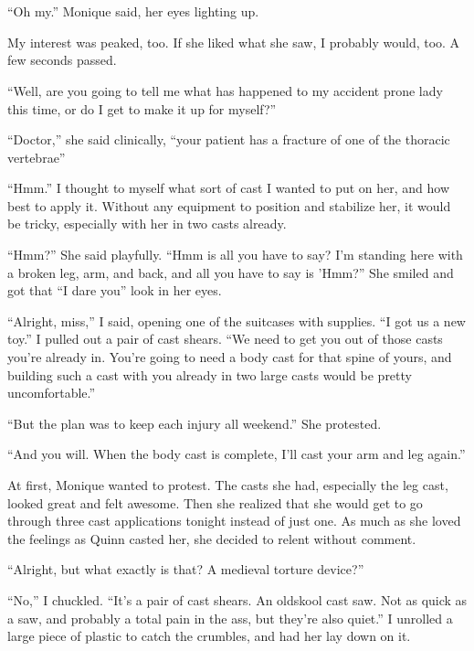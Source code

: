 \chapter{~}
``Oh my.'' Monique said, her eyes lighting up.

My interest was peaked, too. If she liked what she saw, I probably would, too. A few
seconds passed.

``Well, are you going to tell me what has happened to my accident prone lady this time, or
do I get to make it up for myself?''

``Doctor,'' she said clinically, ``your patient has a fracture of one of the thoracic
vertebrae''

``Hmm.'' I thought to myself what sort of cast I wanted to put on her, and how best to apply
it. Without any equipment to position and stabilize her, it would be tricky, especially with her
in two casts already.

``Hmm?'' She said playfully. ``Hmm is all you have to say? I'm standing here with a broken
leg, arm, and back, and all you have to say is 'Hmm?'' She smiled and got that ``I dare you''
look
in her eyes.

``Alright, miss,'' I said, opening one of the suitcases with supplies. ``I got us a new toy.''
I pulled out a pair of cast shears. ``We need to get you out of those casts you're already in.
You're going to need a body cast for that spine of yours, and building such a cast with you
already in two large casts would be pretty uncomfortable.''

``But the plan was to keep each injury all weekend.'' She protested.

``And you will. When the body cast is complete, I'll cast your arm and leg again.''

\begin{thought}
At first, Monique wanted to protest. The casts she had, especially the leg cast, looked
great and felt awesome. Then she realized that she would get to go through three cast
applications tonight instead of just one. As much as she loved the feelings as Quinn casted her,
she decided to relent without comment.
\end{thought}

``Alright, but what exactly is that? A medieval torture device?''

``No,'' I chuckled. ``It's a pair of cast shears. An oldskool cast saw. Not as quick as a saw,
and probably a total pain in the ass, but they're also quiet.'' I unrolled a large piece of
plastic to catch the crumbles, and had her lay down on it.

